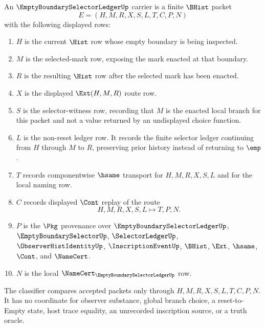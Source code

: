 \begin{definition}\label{def:empty-boundary-selector-ledger-carrier}
An $\EmptyBoundarySelectorLedgerUp$ carrier is a finite $\BHist$ packet
$$
E=(H,M,R,X,S,L,T,C,P,N)
$$
with the following displayed rows:
\begin{enumerate}
\item $H$ is the current $\Hist$ row whose empty boundary is being inspected.
\item $M$ is the selected-mark row, exposing the mark enacted at that boundary.
\item $R$ is the resulting $\Hist$ row after the selected mark has been enacted.
\item $X$ is the displayed $\Ext(H,M,R)$ route row.
\item $S$ is the selector-witness row, recording that $M$ is the enacted local branch for this packet and not a value returned by an undisplayed choice function.
\item $L$ is the non-reset ledger row. It records the finite selector ledger continuing from $H$ through $M$ to $R$, preserving prior history instead of returning to $\emp$.
\item $T$ records componentwise $\hsame$ transport for $H,M,R,X,S,L$ and for the local naming row.
\item $C$ records displayed $\Cont$ replay of the route
$$
H,M,R,X,S,L \longmapsto T,P,N .
$$
\item $P$ is the $\Pkg$ provenance over $\EmptyBoundarySelectorLedgerUp$, $\EmptyBoundarySelectorUp$, $\SelectorLedgerUp$, $\ObserverHistIdentityUp$, $\InscriptionEventUp$, $\BHist$, $\Ext$, $\hsame$, $\Cont$, and $\NameCert$.
\item $N$ is the local $\NameCert_{\EmptyBoundarySelectorLedgerUp}$ row.
\end{enumerate}
The classifier compares accepted packets only through $H,M,R,X,S,L,T,C,P,N$. It has no coordinate for observer substance, global branch choice, a reset-to-Empty state, host trace equality, an unrecorded inscription source, or a truth oracle.
\end{definition}

